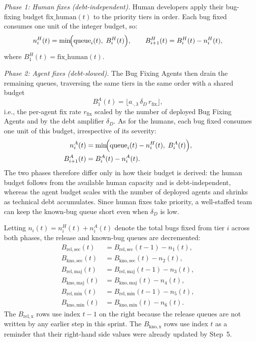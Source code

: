 \documentclass[smallextended]{svjour3}       %
\begin{document}
\emph{Phase 1: Human fixes (debt-independent).} Human developers apply their
bug-fixing budget $\mathrm{fix\_human}(t)$ to the priority tiers in order. Each bug fixed
consumes one unit of the integer budget, so:
\begin{equation}
  n^H_i(t) = \min\!\Bigl(\text{queue}_i(t),\; B^H_i(t)\Bigr),
  \qquad B^H_{i+1}(t) = B^H_i(t) - n^H_i(t),
  \label{eq:human_fixes}
\end{equation}
where $B^H_1(t) = \mathrm{fix\_human}(t)$.

\emph{Phase 2: Agent fixes (debt-slowed).} The Bug Fixing Agents then drain the
remaining queues, traversing the same tiers in the same order with a shared budget
\begin{equation}
  B^A_1(t) = \bigl\lfloor a_{\cdot,3}\,\delta_D\,r_\mathrm{fix}\bigr\rfloor,
  \label{eq:fix_budget}
\end{equation}
i.e., the per-agent fix rate $r_\mathrm{fix}$ scaled by the number of deployed Bug Fixing
Agents and by the debt amplifier $\delta_D$. As for the humans, each bug fixed consumes one
unit of this budget, irrespective of its severity:
\begin{align}
  n^A_i(t) &= \min\!\Bigl(\text{queue}_i(t) - n^H_i(t),\; B^A_i(t)\Bigr),
  \label{eq:fixes} \\
  B^A_{i+1}(t) &= B^A_i(t) - n^A_i(t). \nonumber
\end{align}
The two phases therefore differ only in how their budget is derived: the human budget follows
from the available human capacity and is debt-independent, whereas the agent budget scales with
the number of deployed agents and shrinks as technical debt accumulates.
Since human fixes take priority, a well-staffed team can
keep the known-bug queue short even when $\delta_D$ is low.

Letting $n_i(t) = n^H_i(t) + n^A_i(t)$ denote the total bugs fixed from tier $i$
across both phases, the release and known-bug queues are decremented:
\begin{align}
  B_\mathrm{rel,sec}(t) &= B_\mathrm{rel,sec}(t-1) - n_1(t), \nonumber \\
  B_\mathrm{kno,sec}(t) &= B_\mathrm{kno,sec}(t)   - n_2(t), \nonumber \\
  B_\mathrm{rel,maj}(t) &= B_\mathrm{rel,maj}(t-1) - n_3(t), \nonumber \\
  B_\mathrm{kno,maj}(t) &= B_\mathrm{kno,maj}(t)   - n_4(t), \nonumber \\
  B_\mathrm{rel,min}(t) &= B_\mathrm{rel,min}(t-1) - n_5(t), \nonumber \\
  B_\mathrm{kno,min}(t) &= B_\mathrm{kno,min}(t)   - n_6(t).
  \label{eq:bfix_update}
\end{align}
The $B_\mathrm{rel,x}$ rows use index $t-1$ on the right because the release
queues are not written by any earlier step in this sprint.  The $B_\mathrm{kno,x}$
rows use index $t$ as a reminder that their right-hand side values
were already updated by Step~5.
\end{document}
